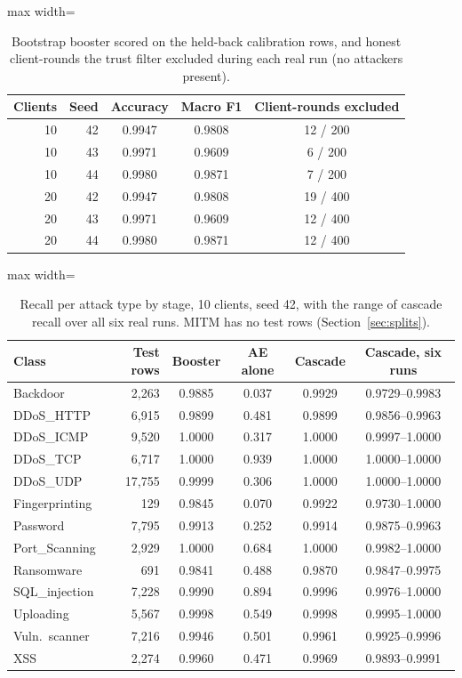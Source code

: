 \begin{table}[t]
\centering
\caption{Bootstrap booster scored on the held-back calibration rows, and honest client-rounds the trust filter excluded during each real run (no attackers present).}
\label{tab:filterhonest}
\small
\begin{adjustbox}{max width=\linewidth}
\begin{tabular}{rrccc}
\toprule
Clients & Seed & Accuracy & Macro F1 & Client-rounds excluded \\
\midrule
10 & 42 & 0.9947 & 0.9808 & 12 / 200 \\
10 & 43 & 0.9971 & 0.9609 & 6 / 200 \\
10 & 44 & 0.9980 & 0.9871 & 7 / 200 \\
20 & 42 & 0.9947 & 0.9808 & 19 / 400 \\
20 & 43 & 0.9971 & 0.9609 & 12 / 400 \\
20 & 44 & 0.9980 & 0.9871 & 12 / 400 \\
\bottomrule
\end{tabular}
\end{adjustbox}
\end{table}

\begin{table}[t]
\centering
\caption{Recall per attack type by stage, 10 clients, seed 42, with the range of cascade recall over all six real runs. MITM has no test rows (Section~\ref{sec:splits}).}
\label{tab:perclass}
\small
\setlength{\tabcolsep}{3pt}
\begin{adjustbox}{max width=\linewidth}
\begin{tabular}{lrcccc}
\toprule
Class & Test rows & Booster & AE alone & Cascade & Cascade, six runs \\
\midrule
Backdoor & 2,263 & 0.9885 & 0.037 & 0.9929 & 0.9729--0.9983 \\
DDoS\_HTTP & 6,915 & 0.9899 & 0.481 & 0.9899 & 0.9856--0.9963 \\
DDoS\_ICMP & 9,520 & 1.0000 & 0.317 & 1.0000 & 0.9997--1.0000 \\
DDoS\_TCP & 6,717 & 1.0000 & 0.939 & 1.0000 & 1.0000--1.0000 \\
DDoS\_UDP & 17,755 & 0.9999 & 0.306 & 1.0000 & 1.0000--1.0000 \\
Fingerprinting & 129 & 0.9845 & 0.070 & 0.9922 & 0.9730--1.0000 \\
Password & 7,795 & 0.9913 & 0.252 & 0.9914 & 0.9875--0.9963 \\
Port\_Scanning & 2,929 & 1.0000 & 0.684 & 1.0000 & 0.9982--1.0000 \\
Ransomware & 691 & 0.9841 & 0.488 & 0.9870 & 0.9847--0.9975 \\
SQL\_injection & 7,228 & 0.9990 & 0.894 & 0.9996 & 0.9976--1.0000 \\
Uploading & 5,567 & 0.9998 & 0.549 & 0.9998 & 0.9995--1.0000 \\
Vuln.\ scanner & 7,216 & 0.9946 & 0.501 & 0.9961 & 0.9925--0.9996 \\
XSS & 2,274 & 0.9960 & 0.471 & 0.9969 & 0.9893--0.9991 \\
\bottomrule
\end{tabular}
\end{adjustbox}
\end{table}

